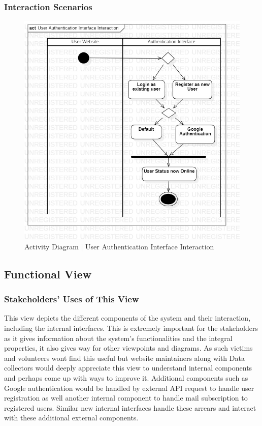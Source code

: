 \subsubsection{Interaction Scenarios}

\begin{figure}[H]
  \centering
  \includegraphics[width=\linewidth]{img/activity-diagram-1-s5.jpg}
  \caption{Activity Diagram | User Authentication Interface Interaction}
\end{figure}

\subsection{Functional View}

\subsubsection{Stakeholders' Uses of This View}

This view depicts the different components of the system and their interaction, including the internal interfaces. This is extremely important for the stakeholders as it gives information about the system’s functionalities and the integral properties, it also gives way for other viewpoints and diagrams. As such victims and volunteers wont find this useful but website maintainers along with Data collectors would deeply appreciate this view to understand internal components and perhaps come up with ways to improve it. Additional components such as Google authentication would be handled by external API request to handle user registration as well another internal component to handle mail subscription to registered users. Similar new internal interfaces handle these arrears and interact with these additional external components.

